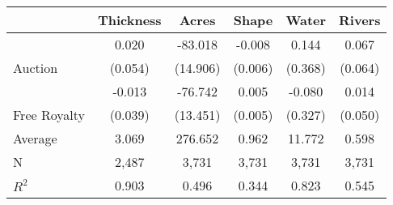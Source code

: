 
\begin{tabular}{lccccc}
\toprule
 & Thickness & Acres & Shape & Water & Rivers\\
\midrule
 & 0.020 & -83.018 & -0.008 & 0.144 & 0.067\\

\multirow{-2}{*}{\raggedright\arraybackslash Auction} & (0.054) & (14.906) & (0.006) & (0.368) & (0.064)\\

 & -0.013 & -76.742 & 0.005 & -0.080 & 0.014\\

\multirow{-2}{*}{\raggedright\arraybackslash Free Royalty} & (0.039) & (13.451) & (0.005) & (0.327) & (0.050)\\

\midrule
Average & 3.069 & 276.652 & 0.962 & 11.772 & 0.598\\

N & 2,487 & 3,731 & 3,731 & 3,731 & 3,731\\

$R^2$ & 0.903 & 0.496 & 0.344 & 0.823 & 0.545\\
\bottomrule
\end{tabular}
